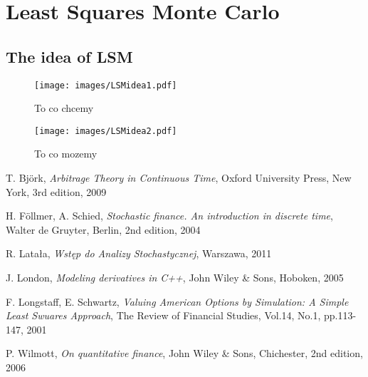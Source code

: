 \documentclass[a4paper,12pt, oneside]{book}
\theoremstyle{definition}
\theoremstyle{remark}
\begin{document}

\chapter{Least Squares Monte Carlo}
\section{The idea of LSM}
\begin{figure}[h]
\centering
 \texttt{[image: images/LSMidea1.pdf]}
\caption{To co chcemy}
\end{figure}
\begin{figure}
\centering
 \texttt{[image: images/LSMidea2.pdf]}
\caption{To co mozemy}
\end{figure}

\begin{thebibliography}{99}

T. Bj\"{o}rk, \emph{Arbitrage Theory in Continuous Time}, Oxford University Press,  New York, 3rd edition, 2009

H. F\"{o}llmer, A. Schied, \emph{Stochastic finance. An introduction in discrete time}, Walter de Gruyter, Berlin, 2nd edition, 2004

R. Latała, \emph{Wstęp do Analizy Stochastycznej}, Warszawa, 2011

J. London, \emph{Modeling derivatives in C++}, John Wiley \& Sons, Hoboken, 2005

F. Longstaff, E. Schwartz, \emph{Valuing American Options by Simulation: A Simple Least Swuares Approach}, The Review of Financial Studies, Vol.14, No.1, pp.113-147, 2001

P. Wilmott, \emph{On quantitative finance}, John Wiley \& Sons, Chichester, 2nd edition, 2006

\end{thebibliography}
\end{document}
